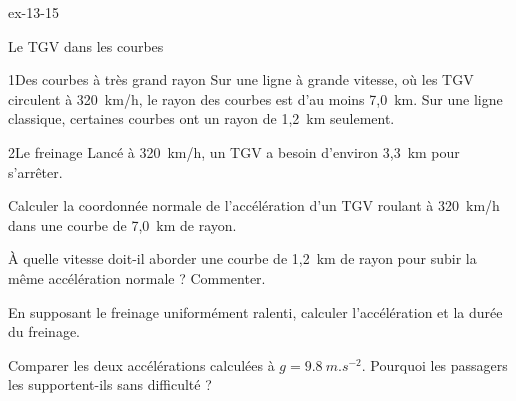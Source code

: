 \begin{blocLivre}{ex-13-15}
\begin{exercice}[3]{Le TGV dans les courbes}
\begin{docu}{1}{Des courbes à très grand rayon}
Sur une ligne à grande vitesse, où les TGV circulent à 320~km/h, le rayon des courbes est d'au moins 7,0~km. Sur une
ligne classique, certaines courbes ont un rayon de 1,2~km seulement.
\end{docu}
\begin{docu}{2}{Le freinage}
Lancé à 320~km/h, un TGV a besoin d'environ 3,3~km pour s'arrêter.
\end{docu}
\begin{questions}
\item Calculer la coordonnée normale de l'accélération d'un TGV roulant à 320~km/h dans une courbe de 7,0~km de rayon.
\item À quelle vitesse doit-il aborder une courbe de 1,2~km de rayon pour subir la même accélération normale ? Commenter.
\item \initiative En supposant le freinage uniformément ralenti, calculer l'accélération et la durée du freinage.
\item Comparer les deux accélérations calculées à $g=\qty{9,8}{m.s^{-2}}$. Pourquoi les passagers les supportent-ils
sans difficulté ?
\end{questions}
\end{exercice}
\end{blocLivre}
